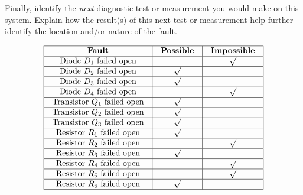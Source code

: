 Finally, identify the {\it next} diagnostic test or measurement you would make on this system.  Explain how the result(s) of this next test or measurement help further identify the location and/or nature of the fault.

\vfil 

\eject







$$\vbox{\offinterlineskip
\halign{\strut
\vrule \quad\hfil # \ \hfil & 
\vrule \quad\hfil # \ \hfil & 
\vrule \quad\hfil # \ \hfil \vrule \cr
\noalign{\hrule}
%
{\bf Fault} & {\bf Possible} & {\bf Impossible} \cr
%
\noalign{\hrule}
%
Diode $D_1$ failed open &  & $\surd$ \cr
%
\noalign{\hrule}
%
Diode $D_2$ failed open & $\surd$ &  \cr
%
\noalign{\hrule}
%
Diode $D_3$ failed open & $\surd$ &  \cr
%
\noalign{\hrule}
%
Diode $D_4$ failed open &  & $\surd$ \cr
%
\noalign{\hrule}
%
Transistor $Q_1$ failed open & $\surd$ &  \cr
%
\noalign{\hrule}
%
Transistor $Q_2$ failed open & $\surd$ &  \cr
%
\noalign{\hrule}
%
Transistor $Q_3$ failed open & $\surd$ &  \cr
%
\noalign{\hrule}
%
Resistor $R_1$ failed open & $\surd$ &  \cr
%
\noalign{\hrule}
%
Resistor $R_2$ failed open &  & $\surd$ \cr
%
\noalign{\hrule}
%
Resistor $R_3$ failed open & $\surd$ &  \cr
%
\noalign{\hrule}
%
Resistor $R_4$ failed open &  & $\surd$ \cr
%
\noalign{\hrule}
%
Resistor $R_5$ failed open &  & $\surd$ \cr
%
\noalign{\hrule}
%
Resistor $R_6$ failed open & $\surd$ &  \cr
%
\noalign{\hrule}
} %
}$$ %










